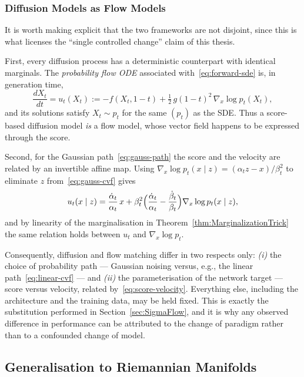 \documentclass[a4paper,12pt]{article}
\theoremstyle{remark}
\begin{document}
\subsubsection{Diffusion Models as Flow Models}
\label{sec:bridge}

It is worth making explicit that the two frameworks are not disjoint, since this is what
licenses the ``single controlled change'' claim of this thesis.

First, every diffusion process has a deterministic counterpart with identical marginals.
The \emph{probability flow ODE} associated with~\eqref{eq:forward-sde} is, in generation
time,
\begin{equation}
\label{eq:pf-ode}
\frac{dX_t}{dt}
=
u_t(X_t)
:=
-f(X_t,1-t)
+
\tfrac12\,g(1-t)^2\,\nabla_x\log p_t(X_t),
\end{equation}
and its solutions satisfy $X_t\sim p_t$ for the same $(p_t)$ as the SDE. Thus a
score-based diffusion model \emph{is} a flow model, whose vector field happens to be
expressed through the score.

Second, for the Gaussian path~\eqref{eq:gauss-path} the score and the velocity are
related by an invertible affine map. Using
$\nabla_x\log p_t(x\mid z)=(\alpha_t z-x)/\beta_t^2$ to eliminate $z$
from~\eqref{eq:gauss-cvf} gives
\begin{equation}
\label{eq:score-velocity}
u_t(x\mid z)
=
\frac{\dot\alpha_t}{\alpha_t}\,x
+
\beta_t^2\Bigl(\frac{\dot\alpha_t}{\alpha_t}-\frac{\dot\beta_t}{\beta_t}\Bigr)
\nabla_x\log p_t(x\mid z),
\end{equation}
and by linearity of the marginalisation in Theorem~\ref{thm:MarginalizationTrick} the
same relation holds between $u_t$ and $\nabla_x\log p_t$.

Consequently, diffusion and flow matching differ in two respects only: \emph{(i)} the
choice of probability path --- Gaussian noising versus, e.g., the linear
path~\eqref{eq:linear-cvf} --- and \emph{(ii)} the parameterisation of the network
target --- score versus velocity, related by~\eqref{eq:score-velocity}. Everything else,
including the architecture and the training data, may be held fixed. This is exactly the
substitution performed in Section~\ref{sec:SigmaFlow}, and it is why any observed
difference in performance can be attributed to the change of paradigm rather than to a
confounded change of model.

\subsection{Generalisation to Riemannian Manifolds}
\label{sec:riemannian-cgm}
\end{document}
